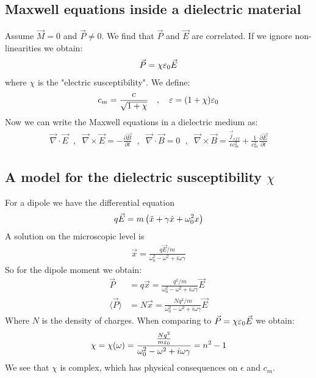 \subsection{Maxwell equations inside a dielectric material}

Assume $\vec{M} = 0$ and $\vec{P} \neq 0$. We find that $\vec{P}$ and $\vec{E}$
are correlated. If we ignore non-linearities we obtain:
\begin{align*}
    \vec{P} = \chi \varepsilon_0 \vec{E}
\end{align*}
where $\chi$ is the "electric susceptibility". We define:
\begin{align*}
    c_m = \frac{c}{\sqrt{1 + \chi}}
    \hspace{10pt} , \hspace{10pt}
    \varepsilon = (1+\chi) \varepsilon_0
\end{align*}
Now we can write the Maxwell equations in a dielectric medium as:
\begin{align*}
    \vec{\nabla} \cdot \vec{E}
    \hspace{7pt} , \hspace{7pt}
    \vec{\nabla} \times \vec{E} = - \frac{\partial \vec{B}}{\partial t}
    \hspace{7pt} , \hspace{7pt}
    \vec{\nabla} \cdot \vec{B} = 0
    \hspace{7pt} , \hspace{7pt}
    \vec{\nabla} \times \vec{B} = \frac{\vec{j}_{eff}}{\epsilon c_m^2} + \frac{1}{c_m^2} \frac{\partial \vec{E}}{\partial t}
\end{align*}

\subsection{A model for the dielectric susceptibility $\chi$}

For a dipole we have the differential equation
\begin{align*}
    q \vec{E} = m \left( \ddot{x} + \gamma \dot{x} + \omega_0^2 x \right)
\end{align*}
A solution on the microscopic level is
\begin{align*}
    \vec{x} = \frac{q \vec{E} / m}{\omega_0^2 - \omega^2 + i \omega \gamma}
\end{align*}
So for the dipole moment we obtain:
\begin{align*}
    \vec{P} &= q \vec{x} = \frac{q^2 / m}{\omega_0^2 - \omega^2 + i \omega \gamma} \vec{E}
    \\
    \langle \vec{P} \rangle &= N \vec{x} = \frac{N q^2 / m}{\omega_0^2 - \omega^2 + i \omega \gamma} \vec{E}
\end{align*}
Where $N$ is the density of charges.
When comparing to $\vec{P} = \chi \varepsilon_0 \vec{E}$ we obtain:
\begin{align*}
    \chi = \chi(\omega) = \frac{\frac{N q^2}{m \varepsilon_0}}{\omega_0^2 - \omega^2 + i \omega \gamma}
    = n^2 - 1
\end{align*}
We see that $\chi$ is complex, which has physical consequences on $\epsilon$ and
$c_m$.

